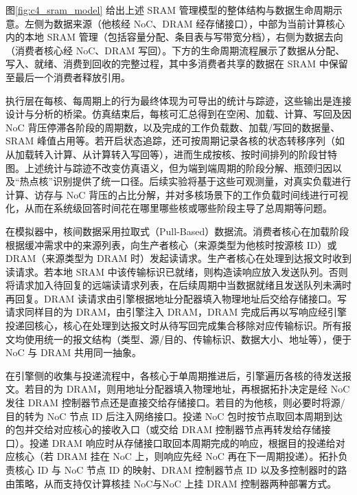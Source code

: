 图\ref{fig:c4_sram_model} 给出上述 SRAM 管理模型的整体结构与数据生命周期示意。左侧为数据来源（他核经 NoC、DRAM 经存储接口），中部为当前计算核心内的本地 SRAM 管理（包括容量分配、条目表与写带宽分档），右侧为数据去向（消费者核心经 NoC、DRAM 写回）。下方的生命周期流程展示了数据从分配、写入、就绪、消费到回收的完整过程，其中多消费者共享的数据在 SRAM 中保留至最后一个消费者释放引用。


执行层在每核、每周期上的行为最终体现为可导出的统计与踪迹，这些输出是连接设计与分析的桥梁。仿真结束后，每核可汇总得到在空闲、加载、计算、写回及因 NoC 背压停滞各阶段的周期数，以及完成的工作负载数、加载/写回的数据量、SRAM 峰值占用等。若开启状态追踪，还可按周期记录各核的状态转移序列（如从加载转入计算、从计算转入写回等），进而生成按核、按时间排列的阶段甘特图。上述统计与踪迹不改变仿真语义，但为端到端周期的阶段分解、瓶颈归因以及“热点核”识别提供了统一口径。后续实验将基于这些可观测量，对真实负载进行计算、访存与 NoC 背压的占比分解，并对多核场景下的工作负载时间线进行可视化，从而在系统级回答时间花在哪里哪些核或哪些阶段主导了总周期等问题。

\label{sec:c3_integration}


在模拟器中，核间数据采用拉取式（Pull-Based）数据流。消费者核心在加载阶段根据缓冲需求中的来源列表，向生产者核心（来源类型为他核时按源核 ID）或 DRAM（来源类型为 DRAM 时）发起读请求。生产者核心在处理到达报文时收到读请求。若本地 SRAM 中该传输标识已就绪，则构造读响应放入发送队列。否则将请求加入待回复的远端读请求列表，在后续周期中当数据就绪且发送队列未满时再回复。DRAM 读请求由引擎根据地址分配器填入物理地址后交给存储接口。写请求同样目的为 DRAM，由引擎注入 DRAM，DRAM 完成后再以写响应经引擎投递回核心，核心在处理到达报文时从待写回完成集合移除对应传输标识。所有报文均使用统一的报文结构（类型、源/目的、传输标识、数据大小、地址等），便于 NoC 与 DRAM 共用同一抽象。

在引擎侧的收集与投递流程中，各核心于单周期推进后，引擎遍历各核的待发送报文。若目的为 DRAM，则用地址分配器填入物理地址，再根据拓扑决定是经 NoC 发往 DRAM 控制器节点还是直接交给存储接口。若目的为他核，则必要时将源/目的转为 NoC 节点 ID 后注入网络接口。投递 NoC 包时按节点取回本周期到达的包并交给对应核心的接收入口（或交给 DRAM 控制器节点再转发给存储接口）。投递 DRAM 响应时从存储接口取回本周期完成的响应，根据目的投递给对应核心（若 DRAM 挂在 NoC 上，则响应先经 NoC 再在下一周期投递）。拓扑负责核心 ID 与 NoC 节点 ID 的映射、DRAM 控制器节点 ID 以及多控制器时的路由策略，从而支持仅计算核挂 NoC与NoC 上挂 DRAM 控制器两种部署方式。

